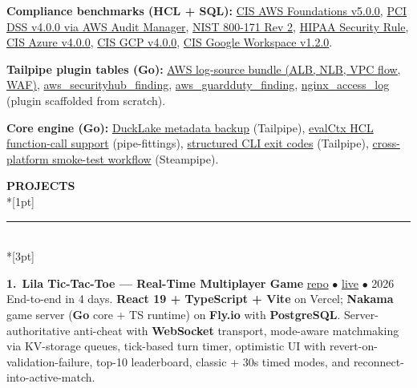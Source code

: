 \documentclass[10pt,letterpaper]{article}
\newcommand{\rsection}[1]{%
  \vspace{0.85em}%
  {\color{primary}\fontsize{10.5pt}{12pt}\bfseries\selectfont\MakeUppercase{#1}}\\*[1pt]%
  \textcolor{rulec}{\rule{\linewidth}{0.4pt}}\\*[3pt]%
  \nobreak%
}
\let\olditemize\itemize
\let\endolditemize\enditemize
\renewenvironment{itemize}
  {\olditemize\setlength{\itemsep}{2pt}\setlength{\parsep}{0pt}\setlength{\topsep}{1pt}\setlength{\partopsep}{0pt}\setlength{\leftmargin}{1.2em}}
  {\endolditemize}
\begin{document}
\begin{itemize}
\item \textbf{Compliance benchmarks (HCL + SQL):} \href{https://github.com/turbot/steampipe-mod-aws-compliance/pull/881}{CIS AWS Foundations v5.0.0}, \href{https://github.com/turbot/steampipe-mod-aws-compliance/pull/871}{PCI DSS v4.0.0 via AWS Audit Manager}, \href{https://github.com/turbot/steampipe-mod-aws-compliance/pull/649}{NIST 800-171 Rev 2}, \href{https://github.com/turbot/steampipe-mod-aws-compliance/pull/654}{HIPAA Security Rule}, \href{https://github.com/turbot/steampipe-mod-azure-compliance/pull/300}{CIS Azure v4.0.0}, \href{https://github.com/turbot/steampipe-mod-gcp-compliance/pull/195}{CIS GCP v4.0.0}, \href{https://github.com/turbot/steampipe-mod-googleworkspace-compliance/pull/2}{CIS Google Workspace v1.2.0}.

\item \textbf{Tailpipe plugin tables (Go):} \href{https://github.com/turbot/tailpipe-plugin-aws/pull/116}{AWS log-source bundle (ALB, NLB, VPC flow, WAF)}, \href{https://github.com/turbot/tailpipe-plugin-aws/pull/156}{aws\_securityhub\_finding}, \href{https://github.com/turbot/tailpipe-plugin-aws/pull/130}{aws\_guardduty\_finding}, \href{https://github.com/turbot/tailpipe-plugin-nginx/pull/23}{nginx\_access\_log} (plugin scaffolded from scratch).

\item \textbf{Core engine (Go):} \href{https://github.com/turbot/tailpipe/pull/564}{DuckLake metadata backup} (Tailpipe), \href{https://github.com/turbot/pipe-fittings/pull/740}{evalCtx HCL function-call support} (pipe-fittings), \href{https://github.com/turbot/tailpipe/pull/534}{structured CLI exit codes} (Tailpipe), \href{https://github.com/turbot/steampipe/pull/4602}{cross-platform smoke-test workflow} (Steampipe).
\end{itemize}

\rsection{Projects}

{\color{accent}\bfseries 1.}~\textbf{Lila Tic-Tac-Toe --- Real-Time Multiplayer Game} \hfill {\color{muted}\small \href{https://github.com/Priyanka-Chatterjee-2000/lila-tictactoe}{repo} \textcolor{rulec}{$\bullet$} \href{https://react-frontend-hazel-one.vercel.app}{live} \textcolor{rulec}{$\bullet$} 2026}\\
End-to-end in 4 days. \textbf{React 19 + TypeScript + Vite} on Vercel; \textbf{Nakama} game server (\textbf{Go} core + TS runtime) on \textbf{Fly.io} with \textbf{PostgreSQL}. Server-authoritative anti-cheat with \textbf{WebSocket} transport, mode-aware matchmaking via KV-storage queues, tick-based turn timer, optimistic UI with revert-on-validation-failure, top-10 leaderboard, classic + 30s timed modes, and reconnect-into-active-match.
\end{document}
